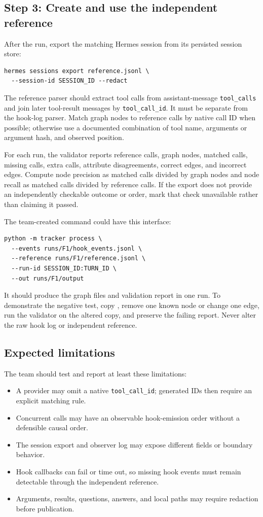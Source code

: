 \documentclass[11pt]{article}
\begin{document}
\subsection{Step 3: Create and use the independent reference}
After the run, export the matching Hermes session from its persisted session store:
\begin{verbatim}
hermes sessions export reference.jsonl \
  --session-id SESSION_ID --redact
\end{verbatim}
The reference parser should extract tool calls from assistant-message \texttt{tool\_calls} and join later tool-result messages by \texttt{tool\_call\_id}. It must be separate from the hook-log parser. Match graph nodes to reference calls by native call ID when possible; otherwise use a documented combination of tool name, arguments or argument hash, and observed position.

For each run, the validator reports reference calls, graph nodes, matched calls, missing calls, extra calls, attribute disagreements, correct edges, and incorrect edges. Compute node precision as matched calls divided by graph nodes and node recall as matched calls divided by reference calls. If the export does not provide an independently checkable outcome or order, mark that check unavailable rather than claiming it passed.

\begin{samepage}
The team-created command could have this interface:
\begin{verbatim}
python -m tracker process \
  --events runs/F1/hook_events.jsonl \
  --reference runs/F1/reference.jsonl \
  --run-id SESSION_ID:TURN_ID \
  --out runs/F1/output
\end{verbatim}
\end{samepage}
It should produce the graph files and validation report in one run. To demonstrate the negative test, copy , remove one known node or change one edge, run the validator on the altered copy, and preserve the failing report. Never alter the raw hook log or independent reference.

\subsection{Expected limitations}
The team should test and report at least these limitations:
\begin{itemize}
  \item A provider may omit a native \texttt{tool\_call\_id}; generated IDs then require an explicit matching rule.
  \item Concurrent calls may have an observable hook-emission order without a defensible causal order.
  \item The session export and observer log may expose different fields or boundary behavior.
  \item Hook callbacks can fail or time out, so missing hook events must remain detectable through the independent reference.
  \item Arguments, results, questions, answers, and local paths may require redaction before publication.
\end{itemize}
\end{document}
